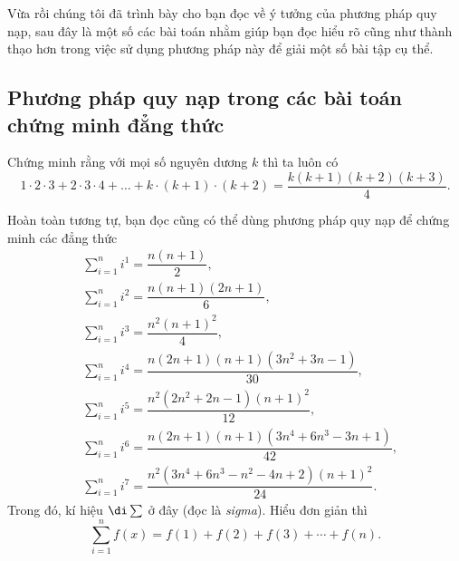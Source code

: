 Vừa rồi chúng tôi đã trình bày cho bạn đọc về ý tưởng của phương pháp quy nạp, sau đây là một số các bài toán nhằm giúp bạn đọc hiểu rõ cũng như thành thạo hơn trong việc sử dụng phương pháp này để giải một số bài tập cụ thể.
\subsection{Phương pháp quy nạp trong các bài toán chứng minh đẳng thức}
\begin{bx}
Chứng minh rằng với mọi số nguyên dương $k$ thì ta luôn có 
\[1 \cdot 2 \cdot 3+2 \cdot 3 \cdot 4+\ldots+k \cdot(k+1) \cdot(k+2)=\dfrac{k(k+1)(k+2)(k+3)}{4}.\tag{*}\]
\begin{luuy}
Hoàn toàn tương tự, bạn đọc cũng có thể dùng phương pháp quy nạp để chứng minh các đẳng thức
\[\begin{aligned}
&\sum_{i=1}^{n} i^{1}=\dfrac{n (n+1)}{2}, \\
&\sum_{i=1}^{n} i^{2}=\dfrac{n (n+1) (2 n+1)}{6}, \\
&\sum_{i=1}^{n} i^{3}=\dfrac{n^{2} (n+1)^{2}}{4}, \\
&\sum_{i=1}^{n} i^{4}=\dfrac{n (2 n+1) (n+1) \left(3 n^{2}+3 n-1\right)}{30}, \\
&\sum_{i=1}^{n} i^{5}=\dfrac{n^{2} \left(2 n^{2}+2 n-1\right) (n+1)^{2}}{12}, \\
&\sum_{i=1}^{n} i^{6}=\dfrac{n (2 n+1) (n+1) \left(3 n^{4}+6 n^{3}-3 n+1\right)}{42}, \\
&\sum_{i=1}^{n} i^{7}=\dfrac{n^{2} \left(3 n^{4}+6 n^{3}-n^{2}-4 n+2\right) (n+1)^{2}}{24}.
\end{aligned}\]
Trong đó, kí hiệu $\di\sum$ ở đây (đọc là \textit{sigma}). Hiểu đơn giản thì
\[\sum_{i=1}^{n} f(x) = f(1) + f(2) + f(3) + \cdots +f(n).\]
\end{luuy}
\end{bx}

